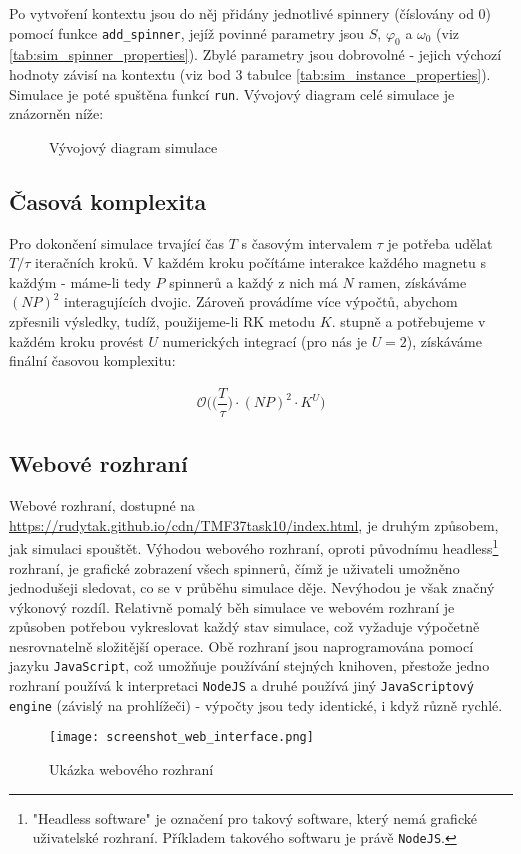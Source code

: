 Po vytvoření kontextu jsou do něj přidány jednotlivé spinnery (číslovány od 0) pomocí funkce \texttt{add\_spinner}, jejíž povinné parametry jsou $S$, $\varphi_0$ a $\omega_0$ (viz \autoref{tab:sim_spinner_properties}). Zbylé parametry jsou dobrovolné - jejich výchozí hodnoty závisí na kontextu (viz bod 3 tabulce \ref{tab:sim_instance_properties}). Simulace je poté spuštěna funkcí \texttt{run}.
Vývojový diagram celé simulace je znázorněn níže:

\begin{figure}[!ht]
    
    \caption{Vývojový diagram simulace}
    \label{fig:flowchart}
\end{figure}

\clearpage

\subsection{Časová komplexita}

Pro dokončení simulace trvající čas $T$ s časovým intervalem $\tau$ je potřeba udělat $T/\tau$ iteračních kroků. V každém kroku počítáme interakce každého magnetu s každým - máme-li tedy $P$ spinnerů a každý z nich má $N$ ramen, získáváme $(NP)^2$ interagujících dvojic. Zároveň provádíme více výpočtů, abychom zpřesnili výsledky, tudíž, použijeme-li RK metodu $K$. stupně a potřebujeme v každém kroku provést $U$ numerických integrací (pro nás je $U = 2$), získáváme finální časovou komplexitu:

\begin{equation}
    \label{eq:sim_complexity}
    \begin{gathered}
        \mathcal{O} \bigg( \bigg( \dfrac{T}{\tau} \bigg) \cdot (N P)^2 \cdot K^U \bigg)
    \end{gathered}
\end{equation}

\subsection{Webové rozhraní}

Webové rozhraní, dostupné na \url{https://rudytak.github.io/cdn/TMF37task10/index.html}, je druhým způsobem, jak simulaci spouštět. Výhodou webového rozhraní, oproti původnímu headless\footnote{"Headless software" je označení pro takový software, který nemá grafické uživatelské rozhraní. Příkladem takového softwaru je právě \texttt{NodeJS}.} rozhraní, je grafické zobrazení všech spinnerů, čímž je uživateli umožněno jednodušeji sledovat, co se v průběhu simulace děje. Nevýhodou je však značný výkonový rozdíl. Relativně pomalý běh simulace ve webovém rozhraní je způsoben potřebou vykreslovat každý stav simulace, což vyžaduje výpočetně nesrovnatelně složitější operace. 
Obě rozhraní jsou naprogramována pomocí jazyku \texttt{JavaScript}, což umožňuje používání stejných knihoven, přestože jedno rozhraní používá k interpretaci \texttt{NodeJS} a druhé používá jiný \texttt{JavaScriptový engine} (závislý na prohlížeči) - výpočty jsou tedy identické, i když různě rychlé.

\begin{figure}[!ht]
    \centering
    \texttt{[image: screenshot\_web\_interface.png]}
    \caption{Ukázka webového rozhraní}
    \label{fig:web_interface}
\end{figure}